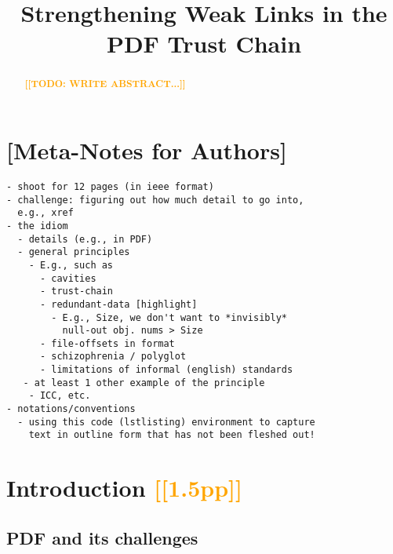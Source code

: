 \documentclass[conference,11pt]{IEEEtran}
\newcommand{\note}[1]{\noteYes{#1}}
\newcommand{\noteYes}[1]{\textbf{\textcolor{orange}{[[#1]]}}}
\newcommand{\todo}[1]{\note{TODO: #1}}
\begin{document}
\date{}

\title{Strengthening Weak Links in the PDF Trust Chain}

\author{
     \and
}

\maketitle

\begin{abstract}

\todo{WRITE ABSTRACT...}
  
\end{abstract}

\section{[Meta-Notes for Authors]}
\begin{lstlisting}
- shoot for 12 pages (in ieee format)
- challenge: figuring out how much detail to go into,
  e.g., xref
- the idiom
  - details (e.g., in PDF)
  - general principles
    - E.g., such as
      - cavities
      - trust-chain 
      - redundant-data [highlight]
        - E.g., Size, we don't want to *invisibly*
          null-out obj. nums > Size
      - file-offsets in format
      - schizophrenia / polyglot
      - limitations of informal (english) standards
   - at least 1 other example of the principle
    - ICC, etc.
- notations/conventions
  - using this code (lstlisting) environment to capture
    text in outline form that has not been fleshed out!
\end{lstlisting}

\section{Introduction \note{1.5pp}}
\label{sec:intro}

\subsection{PDF and its challenges}
\end{document}
